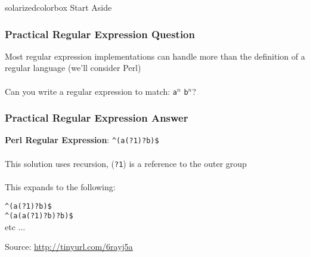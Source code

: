 \documentclass[aspectratio=169]{beamer}
\begin{document}
\begin{frame}
  \begin{beamercolorbox}[wd=\paperwidth, sep=2em]{solarizedcolorbox}
    { \hfill Start Aside}
  \end{beamercolorbox}
\end{frame}

\begin{frame}
\frametitle{Practical Regular Expression Question}

Most regular expression implementations can handle more than the definition of
a \alert{regular language} (we'll consider Perl)\\~\\

Can you write a regular expression to match: {\tt a}$^n$ {\tt b}$^n$?
\end{frame}

\begin{frame}
\frametitle{Practical Regular Expression Answer}

\textbf{Perl Regular Expression}: \lstinline{^(a(?1)?b)$}\\~\\

This solution uses recursion, (\lstinline{?1}) is a reference to the outer group
\\~\\

This expands to the following:

\begin{center}
\lstinline{^(a(?1)?b)$}\\
\lstinline{^(a(a(?1)?b)?b)$}\\
etc $\dots$
\end{center}

\vfill
\begin{flushright}
Source: \url{http://tinyurl.com/6rayj5a}
\end{flushright}
\end{frame}
\end{document}
